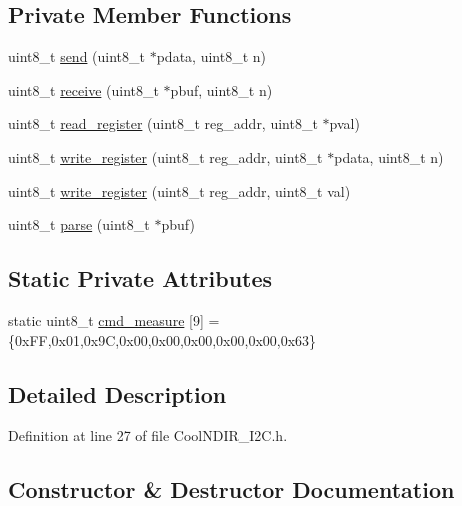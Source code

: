 \subsection*{Private Member Functions}
\begin{DoxyCompactItemize}
\item 
uint8\+\_\+t \hyperlink{class_n_d_i_r___i2_c_aab0c04c2b7d08e99d12af044df179f0c}{send} (uint8\+\_\+t $\ast$pdata, uint8\+\_\+t n)
\item 
uint8\+\_\+t \hyperlink{class_n_d_i_r___i2_c_aa6d2b8dd287f9c9015461cebb18f9abc}{receive} (uint8\+\_\+t $\ast$pbuf, uint8\+\_\+t n)
\item 
uint8\+\_\+t \hyperlink{class_n_d_i_r___i2_c_aa72058e6e7c6174b14466fee4b2df1e0}{read\+\_\+register} (uint8\+\_\+t reg\+\_\+addr, uint8\+\_\+t $\ast$pval)
\item 
uint8\+\_\+t \hyperlink{class_n_d_i_r___i2_c_a5de6a044b00e985f035edca07521e319}{write\+\_\+register} (uint8\+\_\+t reg\+\_\+addr, uint8\+\_\+t $\ast$pdata, uint8\+\_\+t n)
\item 
uint8\+\_\+t \hyperlink{class_n_d_i_r___i2_c_a8ad2a76f9866b0a1f34810a147b4b20d}{write\+\_\+register} (uint8\+\_\+t reg\+\_\+addr, uint8\+\_\+t val)
\item 
uint8\+\_\+t \hyperlink{class_n_d_i_r___i2_c_a907b756fc9244c7398b7d187b73cde94}{parse} (uint8\+\_\+t $\ast$pbuf)
\end{DoxyCompactItemize}
\subsection*{Static Private Attributes}
\begin{DoxyCompactItemize}
\item 
static uint8\+\_\+t \hyperlink{class_n_d_i_r___i2_c_af47e04052a5fb25c79e7142b673aae28}{cmd\+\_\+measure} \mbox{[}9\mbox{]} = \{0x\+F\+F,0x01,0x9\+C,0x00,0x00,0x00,0x00,0x00,0x63\}
\end{DoxyCompactItemize}


\subsection{Detailed Description}


Definition at line 27 of file Cool\+N\+D\+I\+R\+\_\+\+I2\+C.\+h.



\subsection{Constructor \& Destructor Documentation}
\mbox{\label{class_n_d_i_r___i2_c_afc80d767776f4c66cef61312890e98a2}} 
